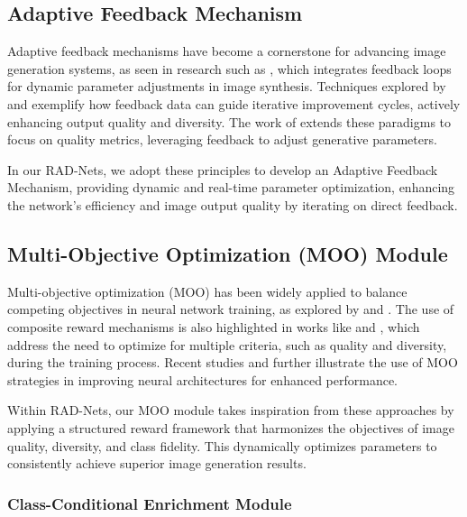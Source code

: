 \documentclass{article} %
\begin{document}
\subsection{Adaptive Feedback Mechanism}

Adaptive feedback mechanisms have become a cornerstone for advancing image generation systems, as seen in research such as \citep{schmidt2019dynamic}, which integrates feedback loops for dynamic parameter adjustments in image synthesis. Techniques explored by \citep{singh2018feedback} and \citep{schwarz2018progressive} exemplify how feedback data can guide iterative improvement cycles, actively enhancing output quality and diversity. The work of \citep{salimans2016improved} extends these paradigms to focus on quality metrics, leveraging feedback to adjust generative parameters. 

In our RAD-Nets, we adopt these principles to develop an Adaptive Feedback Mechanism, providing dynamic and real-time parameter optimization, enhancing the network's efficiency and image output quality by iterating on direct feedback.

\subsection{Multi-Objective Optimization (MOO) Module}

Multi-objective optimization (MOO) has been widely applied to balance competing objectives in neural network training, as explored by \citep{kim2005multi} and \citep{deb2002fast}. The use of composite reward mechanisms is also highlighted in works like \citep{van2016deep} and \citep{anderson2018deep}, which address the need to optimize for multiple criteria, such as quality and diversity, during the training process. Recent studies \citep{tan2019efficientnet} and \citep{liu2018progressive} further illustrate the use of MOO strategies in improving neural architectures for enhanced performance.

Within RAD-Nets, our MOO module takes inspiration from these approaches by applying a structured reward framework that harmonizes the objectives of image quality, diversity, and class fidelity. This dynamically optimizes parameters to consistently achieve superior image generation results.

\subsubsection{Class-Conditional Enrichment Module}
\end{document}
